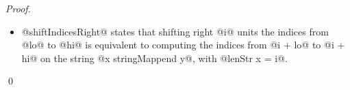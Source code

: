 \begin{proof}
\begin{itemize}
\item @shiftIndicesRight@ states that shifting right @i@ units the indices from @lo@ to @hi@
is equivalent to computing the indices from @i + lo@
to @i + hi@ on the string @x stringMappend y@, with @lenStr x = i@.
\end{itemize}
\qed\end{proof}
